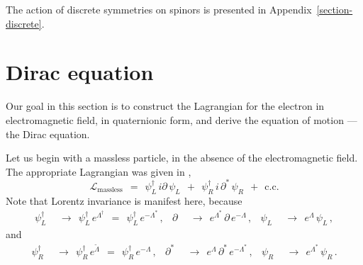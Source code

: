 \documentclass[epsfig,12pt]{article}
\newcommand{\wt}{\widetilde}
\newcommand{\mc}[1]{\mathcal{#1}}
\begin{document}
	The action of discrete symmetries on spinors is presented in Appendix~\ref{section-discrete}.




\section{Dirac equation}
\label{section-dirac}
\setcounter{equation}{0}

	Our goal in this section is to construct the Lagrangian for the electron in electromagnetic field,
	in quaternionic form, and derive the equation of motion --- the Dirac equation.

	Let us begin with a massless particle, in the absence of the electromagnetic field.
	The appropriate Lagrangian was given in \cite{thesis},
\begin{equation}
\label{L-massless}
	\mc L_\text{massless}
		~~=~~	\psi_L^\dag\, i\partial\, \psi_L  ~~+~~  \psi_R^\dag\, i\,\partial^*\, \psi_R
			~~+~~  \text{c.c.}
\end{equation}
	Note that Lorentz invariance is manifest here, because
\begin{align}
	\psi_L^\dag	& ~~\to~~	\psi_L^\dag\, e^{\Lambda^\dag}  ~~=~~  \psi_L^\dag\, e^{-\Lambda^*}\,,
	&
	\partial	& ~~\to~~	e^{\Lambda^*}\, \partial\, e^{-\Lambda}\,,
	&
	\psi_L		& ~~\to~~	e^\Lambda\, \psi_L\,,
\end{align}
	and
\begin{align}
	\psi_R^\dag	& ~~\to~~	\psi_R^\dag\, e^{\wt \Lambda}  ~~=~~  \psi_R^\dag\, e^{-\Lambda}\,,
	&
	\partial^*	& ~~\to~~	e^\Lambda\, \partial^*\, e^{-\Lambda^*}\,,
	&
	\psi_R		& ~~\to~~	e^{\Lambda^*}\, \psi_R\,.
\end{align}
\end{document}

